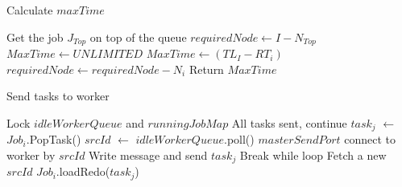 \begin{algorithm}[htb]
    \caption{Calculate $maxTime$}\label{algo:maxTime}
    \begin{algorithmic}[1]
        \State Get the job $J_{Top}$ on top of the queue
        \State $requiredNode\gets I-N_{Top}$
        \State $MaxTime\gets UNLIMITED$
            \State $MaxTime\gets (TL_{I}-RT_{i})$
            \State $requiredNode\gets requiredNode-N_{i}$
                \State Return $MaxTime$
            \EndIf
        \EndFor
        \EndProcedure
    \end{algorithmic}
\end{algorithm}
% 

\begin{algorithm}
    \caption{Send tasks to worker}\label{algo:sendTask}
    \begin{algorithmic}[1]
        \State Lock $idleWorkerQueue$ and $runningJobMap$
                \State All tasks sent, continue
            \EndIf
            \State $task_{j}$ $\gets$  $Job_{i}$.PopTask()
            \State $srcId$ $\gets$  $idleWorkerQueue$.poll()
                \State $masterSendPort$ connect to worker by $srcId$
                \State Write message and send $task_{j}$
                    \State Break while loop
                \Else
                    \State Fetch a new $srcId$
                \EndIf
            \EndWhile
                \State $Job_{i}$.loadRedo($task_{j}$)
            \EndIf
        \EndFor
        \EndProcedure
    \end{algorithmic}
\end{algorithm}

